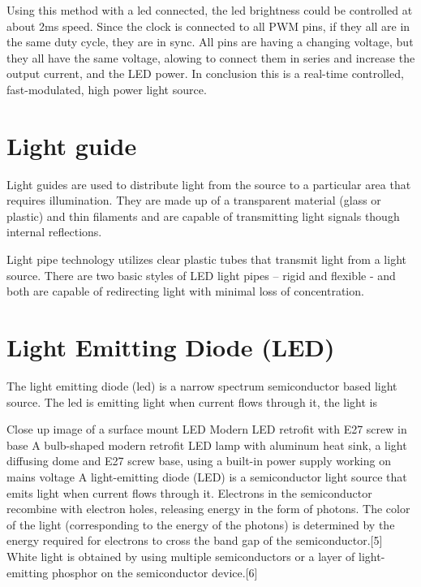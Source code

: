 \documentclass[\main/master.tex]{subfiles}
\begin{document}
\par
Using this method with a led connected, the led brightness could be controlled at about 2ms speed. Since the clock is connected to all PWM pins, if they all are in the same duty cycle, they are in sync. All pins are having a changing voltage, but they all have the same voltage, alowing to connect them in series and increase the output current, and the LED power. In conclusion this is a real-time controlled, fast-modulated, high power light source. 
\section{Light guide}

\color{blue}
\par
Light guides are used to distribute light from the source to a particular area that requires illumination. They are made up of a transparent material (glass or plastic) and thin filaments and are capable of transmitting light signals though internal reflections.  

Light pipe technology utilizes clear plastic tubes that transmit light from a light source. There are two basic styles of LED light pipes – rigid and flexible - and both are capable of redirecting light with minimal loss of concentration.

\color{black}
\section{Light Emitting Diode (LED)}
The light emitting diode (led) is a narrow spectrum semiconductor based light source. The led is emitting light when current flows through it, the light is 
\color{blue}
\par


Close up image of a surface mount LED
Modern LED retrofit with E27 screw in base
A bulb-shaped modern retrofit LED lamp with aluminum heat sink, a light diffusing dome and E27 screw base, using a built-in power supply working on mains voltage
A light-emitting diode (LED) is a semiconductor light source that emits light when current flows through it. Electrons in the semiconductor recombine with electron holes, releasing energy in the form of photons. The color of the light (corresponding to the energy of the photons) is determined by the energy required for electrons to cross the band gap of the semiconductor.[5] White light is obtained by using multiple semiconductors or a layer of light-emitting phosphor on the semiconductor device.[6]
\end{document}

